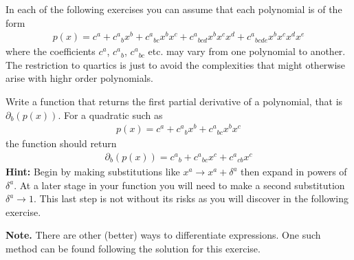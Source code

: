 \documentclass[a4paper,12pt]{article}
\numberwithin{equation}{section}%
\begin{document}
\begin{Exercises}

   In each of the following exercises you can assume that each polynomial is of the form
   \begin{align*}
      p(x) = c^{a}
           + c^{a}{}_{b} x^b
           + c^{a}{}_{b c} x^b x^c
           + c^{a}{}_{b c d} x^b x^c x^d
           + c^{a}{}_{b c d e} x^b x^c x^d x^e
   \end{align*}
   where the coefficients $c^{a}$, $c^{a}{}_{b}$, $c^{a}{}_{b c}$ etc. may vary from one
   polynomial to another. The restriction to quartics is just to avoid the complexities that
   might otherwise arise with highr order polynomials.

   \begin{Exercise}
      Write a function that returns the first partial derivative of a polynomial, that is
      $\partial_{b}(p(x))$. For a quadratic such as
      \begin{align*}
         p(x) = c^{a}
              + c^{a}{}_{b} x^b
              + c^{a}{}_{b c} x^b x^c
      \end{align*}
      the function should return
      \begin{align*}
        \partial_{b}(p(x)) = c^{a}{}_{b}
                           + c^{a}{}_{b c} x^c
                           + c^{a}{}_{c b} x^c
      \end{align*}
      {\bf Hint:} Begin by making substitutions like $x^{a} \rightarrow x^{a} + \delta^{a}$
      then expand in powers of $\delta^{a}$. At a later stage in your function you will need
      to make a second substitution $\delta^{a} \rightarrow 1$. This last step is not
      without its risks as you will discover in the following exercise.

      {\bf Note.} There are other (better) ways to differentiate expressions. One
                  such method can be found following the solution for this exercise.
   \end{Exercise}


\end{Exercises}
\end{document}
